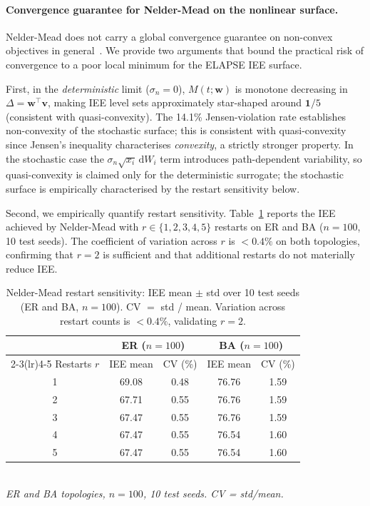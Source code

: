 \documentclass[review,12pt]{elsarticle}
\newcommand{\bfw}{\mathbf{w}}
\newcommand{\bfv}{\mathbf{v}}
\begin{document}
\paragraph{Convergence guarantee for Nelder-Mead on the nonlinear surface.}
Nelder-Mead does not carry a global convergence guarantee on non-convex
objectives in general~\cite{gao2012implementing}.  We provide two arguments
that bound the practical risk of convergence to a poor local minimum for
the ELAPSE IEE surface.

First, in the \emph{deterministic} limit ($\sigma_n=0$), $M(t;\bfw)$ is
monotone decreasing in $\Delta=\bfw^\top\bfv$, making IEE level sets
approximately star-shaped around $\mathbf{1}/5$ (consistent with quasi-convexity).
The 14.1\% Jensen-violation rate establishes non-convexity of the stochastic
surface; this is consistent with quasi-convexity since Jensen's inequality
characterises \emph{convexity}, a strictly stronger property.
In the stochastic case the $\sigma_n\sqrt{x_i}\,\mathrm{d}W_i$ term introduces
path-dependent variability, so quasi-convexity is claimed only for the
deterministic surrogate; the stochastic surface is empirically characterised
by the restart sensitivity below.

Second, we empirically quantify restart sensitivity.
Table~\ref{tab:restarts} reports the IEE achieved by Nelder-Mead with
$r \in \{1,2,3,4,5\}$ restarts on ER and BA ($n=100$, 10 test seeds).
The coefficient of variation across $r$ is $<0.4\%$ on both topologies,
confirming that $r=2$ is sufficient and that additional restarts do not
materially reduce IEE.

\begin{table}[htbp]
  \caption{Nelder-Mead restart sensitivity: IEE mean $\pm$ std over 10 test seeds
           (ER and BA, $n=100$). CV $=$ std / mean.
           Variation across restart counts is $<0.4\%$, validating $r=2$.}
  \label{tab:restarts}
  \centering
  \small
  \renewcommand{\arraystretch}{1.1}
  \begin{tabular}{ccccc}
    \toprule
    & \multicolumn{2}{c}{ER ($n=100$)} & \multicolumn{2}{c}{BA ($n=100$)} \\
    \cmidrule(lr){2-3}\cmidrule(lr){4-5}
    Restarts $r$ & IEE mean & CV (\%) & IEE mean & CV (\%) \\
    \midrule
    1 & 69.08 & 0.48 & 76.76 & 1.59 \\
    2 & 67.71 & 0.55 & 76.76 & 1.59 \\
    3 & 67.47 & 0.55 & 76.76 & 1.59 \\
    4 & 67.47 & 0.55 & 76.54 & 1.60 \\
    5 & 67.47 & 0.55 & 76.54 & 1.60 \\
    \bottomrule
  \end{tabular}
  \smallskip\\
  \small\textit{ER and BA topologies, $n=100$, 10 test seeds. CV = std/mean.}
\end{table}
\end{document}

